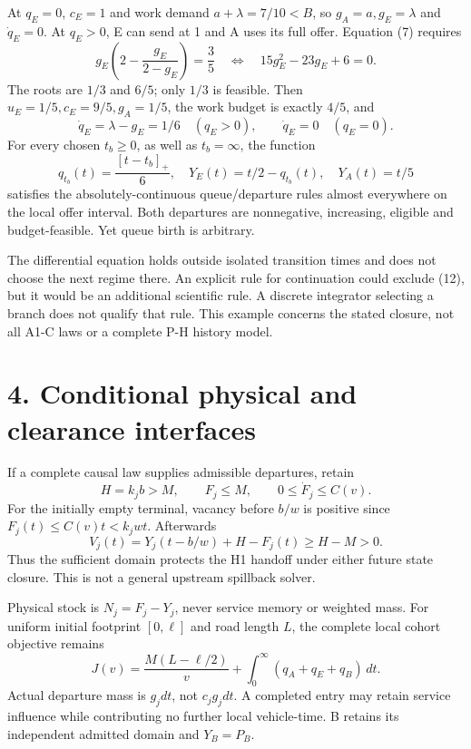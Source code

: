 \documentclass[11pt,a4paper]{article}
\newcommand{\pos}[1]{[#1]_+}
\begin{document}
At $q_E=0$, $c_E=1$ and work demand $a+\lambda=7/10<B$, so
$g_A=a,g_E=\lambda$ and $\dot q_E=0$. At $q_E>0$, E can send at 1
and A uses its full offer. Equation (7) requires
\begin{equation}
 g_E\left(2-\frac{g_E}{2-g_E}\right)=\frac35
 \quad\Longleftrightarrow\quad15g_E^2-23g_E+6=0. \tag{10}
\end{equation}
The roots are $1/3$ and $6/5$; only $1/3$ is feasible. Then
$u_E=1/5,c_E=9/5,g_A=1/5$, the work budget is exactly $4/5$, and
\begin{equation}
 \dot q_E=\lambda-g_E=1/6\quad(q_E>0),\qquad
 \dot q_E=0\quad(q_E=0). \tag{11}
\end{equation}
For every chosen $t_b\geq0$, as well as $t_b=\infty$, the function
\begin{equation}
 q_{t_b}(t)=\frac{\pos{t-t_b}}6,\quad
 Y_E(t)=t/2-q_{t_b}(t),\quad Y_A(t)=t/5 \tag{12}
\end{equation}
satisfies the absolutely-continuous queue/departure rules almost everywhere
on the local offer interval. Both departures are nonnegative, increasing,
eligible and budget-feasible. Yet queue birth is arbitrary.

The differential equation holds outside isolated transition times and
does not choose the next regime there. An explicit rule for continuation
could exclude (12), but it would be an additional scientific rule. A
discrete integrator selecting a branch does not qualify that rule. This
example concerns the stated closure, not all A1-C laws or a complete
P-H history model.

\newpage
\section*{4. Conditional physical and clearance interfaces}

If a complete causal law supplies admissible departures, retain
\begin{equation}
 H=k_jb>M,\qquad F_j\leq M,\qquad 0\leq\dot F_j\leq C(v). \tag{13}
\end{equation}
For the initially empty terminal, vacancy before $b/w$ is positive since
$F_j(t)\leq C(v)t<k_jwt$. Afterwards
\begin{equation}
 V_j(t)=Y_j(t-b/w)+H-F_j(t)\geq H-M>0. \tag{14}
\end{equation}
Thus the sufficient domain protects the H1 handoff under either future
state closure. This is not a general upstream spillback solver.

Physical stock is $N_j=F_j-Y_j$, never service memory or weighted mass.
For uniform initial footprint $[0,\ell]$ and road length $L$, the complete
local cohort objective remains
\begin{equation}
 J(v)=\frac{M(L-\ell/2)}v+\int_0^\infty(q_A+q_E+q_B)\,dt. \tag{15}
\end{equation}
Actual departure mass is $g_jdt$, not $c_jg_jdt$. A completed entry may
retain service influence while contributing no further local vehicle-time.
B retains its independent admitted domain and $Y_B=P_B$.
\end{document}
